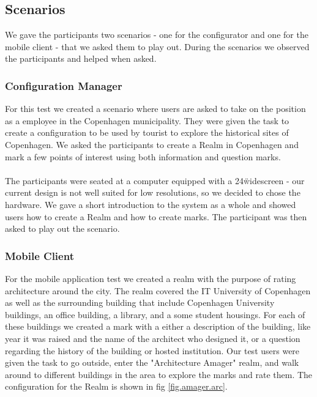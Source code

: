 \subsection{Scenarios} %
\label{sub:scenarios}
We gave the participants two scenarios - one for the configurator and one for the mobile client - that we asked them to play out. During the scenarios we observed the participants and helped when asked.

\subsubsection{Configuration Manager} %
\label{sub:configuration_manager_evaluation}
For this test we created a scenario where users are asked to take on the position as a employee in the Copenhagen municipality. They were given the task to create a configuration to be used by tourist to explore the historical sites of Copenhagen. We asked the participants to create a Realm in Copenhagen and mark a few points of interest using both information and question marks.
\\\\
The participants were seated at a computer equipped with a 24\" widescreen - our current design is not well suited for low resolutions, so we decided to chose the hardware. We gave a short introduction to the system as a whole and showed users how to create a Realm and how to create marks. The participant was then asked to play out the scenario.

\subsubsection{Mobile Client} %
\label{sub:android_application_evaluation}
For the mobile application test we created a realm with the purpose of rating architecture around the city. The realm covered the IT University of Copenhagen as well as the surrounding building that include Copenhagen University buildings, an office building, a library, and a some student housings. For each of these buildings we created a mark with a either a description of the building, like year it was raised and the name of the architect who designed it, or a question regarding the history of the building or hosted institution. Our test users were given the task to go outside, enter the "Architecture Amager" realm, and walk around to different buildings in the area to explore the marks and rate them. The configuration for the Realm is shown in fig \ref{fig.amager.arc}.

